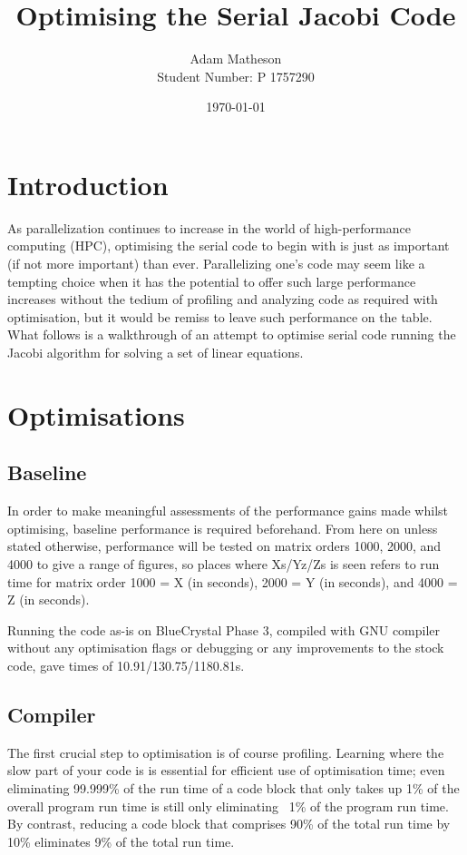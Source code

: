 \documentclass{article}
\begin{document}
\title{Optimising the Serial Jacobi Code}
\author{Adam Matheson \\
Student Number: P 1757290}
\date{\today}
\maketitle

\section{Introduction}
As parallelization continues to increase in the world of high-performance computing (HPC), optimising the serial code to begin with is just as important (if not more important) than ever. Parallelizing one's code may seem like a tempting choice when it has the potential to offer such large performance increases without the tedium of profiling and analyzing code as required with optimisation, but it would be remiss to leave such performance on the table. What follows is a walkthrough of an attempt to optimise serial code running the Jacobi algorithm for solving a set of linear equations.

\section{Optimisations}
\subsection{Baseline}
In order to make meaningful assessments of the performance gains made whilst optimising, baseline performance is required beforehand. From here on unless stated otherwise, performance will be tested on matrix orders 1000, 2000, and 4000 to give a range of figures, so places where Xs/Yz/Zs is seen refers to run time for matrix order 1000 = X (in seconds), 2000 = Y (in seconds), and 4000 = Z (in seconds).

Running the code as-is on BlueCrystal Phase 3, compiled with GNU compiler without any optimisation flags or debugging or any improvements to the stock code, gave times of 10.91/130.75/1180.81s.

\subsection{Compiler}
The first crucial step to optimisation is of course profiling. Learning where the slow part of your code is is essential for efficient use of optimisation time; even eliminating 99.999\% of the run time of a code block that only takes up 1\% of the overall program run time is still only eliminating ~1\% of the program run time. By contrast, reducing a code block that comprises 90\% of the total run time by 10\% eliminates 9\% of the total run time.
\end{document}
